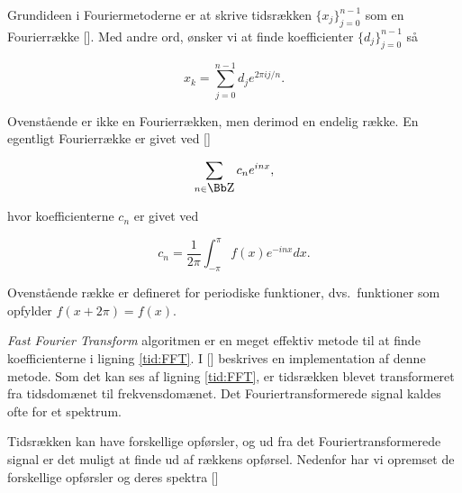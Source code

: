 \vspace{4.0mm}
Grundideen i Fouriermetoderne er at skrive tidsr{\ae}kken
$\{x_j\}_{j=0}^{n-1}$ som en Fourierr{\ae}kke
[]. Med andre ord, {\o}nsker vi at finde
koefficienter $\{d_j\}_{j=0}^{n-1}$ s{\aa}

\begin{equation}
  \label{tid:FFT}
  x_k = \sum_{j=0}^{n-1} d_j e^{2\pi i j/n}.
\end{equation}

Ovenst{\aa}ende er ikke en Fourierr{\ae}kken, men derimod
en endelig r{\ae}kke. En egentligt Fourierr{\ae}kke er
givet ved []

\[
  \sum_{n \in \Z} c_n e^{inx},
\]

hvor koefficienterne $c_n$ er givet ved

\[
c_n = \frac{1}{2\pi}\int_{-\pi}^{\pi} f(x)e^{-inx} dx.
\]

Ovenst{\aa}ende r{\ae}kke er defineret for periodiske
funktioner, dvs.\ funktioner som opfylder $f(x+2\pi) =
f(x)$.

\vspace{4.0mm}
{\em Fast Fourier Transform} algoritmen er en meget
effektiv metode til at finde koefficienterne i ligning
\ref{tid:FFT}. I [] beskrives en
implementation af denne metode. Som det kan ses af ligning
\ref{tid:FFT}, er tidsr{\ae}kken blevet transformeret fra
tidsdom{\ae}net til frekvensdom{\ae}net. Det
Fouriertransformerede signal kaldes ofte for et spektrum.

\vspace{4.0mm}
Tidsr{\ae}kken kan have forskellige opf{\o}rsler, og ud fra
det Fouriertransformerede signal er det muligt at finde ud
af r{\ae}kkens opf{\o}rsel. Nedenfor har vi opremset de
forskellige opf{\o}rsler og deres spektra []

